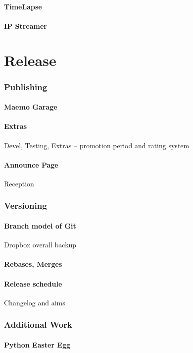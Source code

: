 \documentclass[11pt]{article} %
\begin{document}
\subsection{TimeLapse}
\subsection{IP Streamer}

\part{Release}
\section{Publishing}
\subsection{Maemo Garage}
\subsection{Extras}{Devel, Testing, Extras -- promotion period and rating system}
\subsection{Announce Page}{Reception}

\section{Versioning}
\subsection{Branch model of Git}{Dropbox overall backup}
\subsection{Rebases, Merges}
\subsection{Release schedule}{Changelog and aims}

\section{Additional Work}
\subsection{Python Easter Egg}
\end{document}
